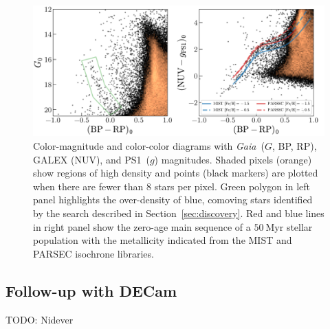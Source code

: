 \documentclass[modern]{aastex62}
\newcommand{\acronym}[1]{{\small{#1}}}
\newcommand{\gaia}{\textsl{Gaia}}
\newcommand{\pans}{\acronym{PS1}}
\newcommand{\decam}{DECam}
\newcommand{\todo}[1]{{\color{red} TODO: #1}}
\newcommand{\sectionname}{Section}
\newcommand{\hi}{H{\footnotesize I} }
\newcommand{\hie}{H{\footnotesize I}}
\begin{document}
\begin{figure}
\centering
\includegraphics[width=\textwidth]{figures/gaia-galex-cmd.pdf}
\caption{Color-magnitude and color-color diagrams with \gaia\ ($G$, BP, RP), \acronym{GALEX} (NUV), and \pans\ ($g$) magnitudes.
Shaded pixels (orange) show regions of high density and points (black markers) are plotted when there are fewer than 8 stars per pixel.
Green polygon in left panel highlights the over-density of blue, comoving stars identified by the search described in \sectionname~\ref{sec:discovery}.
Red and blue lines in right panel show the zero-age main sequence of a $50~\textrm{Myr}$ stellar population with the metallicity indicated from the \acronym{MIST} \citep{TODO} and \acronym{PARSEC} \citep{TODO} isochrone libraries.
}
\label{fig:cmds}
\end{figure}


\subsection{Follow-up with \decam}
\label{sec:decam}

\todo{Nidever}

\end{document}
